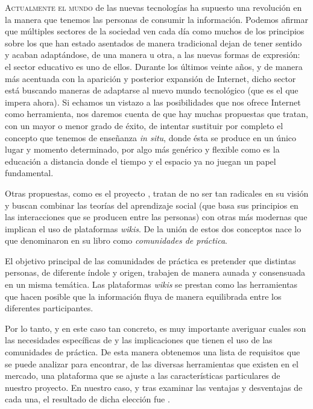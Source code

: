 \lettrine{A}{ctualmente el mundo} de las nuevas tecnologías ha supuesto una revolución en la manera que tenemos las personas de consumir la información. Podemos afirmar que múltiples sectores de la sociedad ven cada día como muchos de los principios sobre los que han estado asentados de manera tradicional dejan de tener sentido y acaban adaptándose, de una manera u otra, a las nuevas formas de expresión: el sector educativo es uno de ellos. Durante los últimos veinte años, y de manera más acentuada con la aparición y posterior expansión de Internet, dicho sector está buscando maneras de adaptarse al nuevo mundo tecnológico (que es el que impera ahora). Si echamos un vistazo a las posibilidades que nos ofrece Internet como herramienta, nos daremos cuenta de que hay muchas propuestas que tratan, con un mayor o menor grado de éxito, de intentar sustituir por completo el concepto que tenemos de enseñanza \textit{in situ}, donde ésta se produce en un único lugar y momento determinado, por algo más genérico y flexible como es la educación a distancia donde el tiempo y el espacio ya no juegan un papel fundamental.

Otras propuestas, como es el proyecto \alma{}, tratan de no ser tan radicales en su visión y buscan combinar las teorías del aprendizaje social (que basa sus principios en las interacciones que se producen entre las personas) con otras más modernas que implican el uso de plataformas \textit{wikis}. De la unión de estos dos conceptos nace lo que \citeauthor{libro:comunidades-de-practica-wenger} denominaron en su libro  \cite{libro:comunidades-de-practica-wenger-primera-edicion} como \textit{comunidades de práctica}. 

El objetivo principal de las comunidades de práctica es pretender que distintas personas, de diferente índole y origen, trabajen de manera aunada y consensuada en un misma temática. Las plataformas \textit{wikis} se prestan como las herramientas que hacen posible que la información fluya de manera equilibrada entre los diferentes participantes. 

Por lo tanto, y en este caso tan concreto, es muy importante averiguar cuales son las necesidades específicas de \alma{} y las implicaciones que tienen el uso de las comunidades de práctica. De esta manera obtenemos una lista de requisitos que se puede analizar para encontrar, de las diversas herramientas que existen en el mercado, una plataforma que se ajuste a las características particulares de nuestro proyecto. En nuestro caso, y tras examinar las ventajas y desventajas de cada una, el resultado de dicha elección fue \tiki{}.

